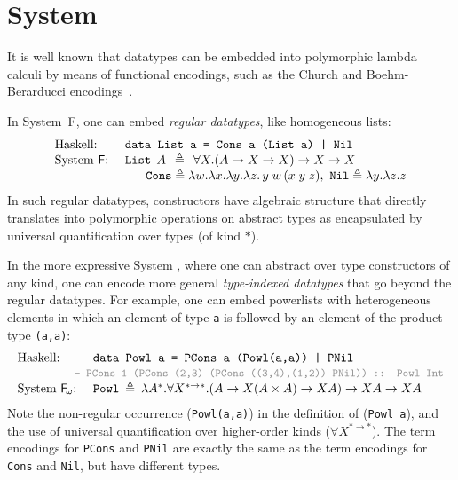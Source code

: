 \chapter{System \Fi}\label{ch:fi}

\newcommand{\newFi}[1]{\colorbox{grey}{\ensuremath{#1}}}

It is well known that datatypes can be embedded into polymorphic lambda
calculi by means of functional encodings,
such as the Church and Boehm-Berarducci encodings~\cite{BoehmBerarducci}.

In System~\textsf{F}, one can embed \emph{regular datatypes},
like homogeneous lists:
\[
\begin{array}{ll}
\text{Haskell:} & \texttt{data List a = Cons a (List a) | Nil} \\
\text{System \textsf{F}:}~& 
\texttt{{List}}\:\: A\:\:\triangleq\:\:
\forall X.
(A\to X\to X) \to X \to X ~~\; \\
&
\quad~~
\texttt{Cons} \triangleq \lambda w.\lambda x.\lambda y.\lambda z.\,y\;w\,(x\;y\;z),~
\texttt{Nil} \triangleq \lambda y.\lambda z.z
\end{array}
\]
In such regular datatypes, constructors have algebraic structure that
directly translates into polymorphic operations on abstract types as
encapsulated by universal quantification over types (of kind $*$).

In the more expressive System \Fw, where one can abstract over
type constructors of any kind, one can encode more general
\emph{type-indexed datatypes} that go beyond the regular datatypes.
For example, one can embed powerlists with heterogeneous elements
in which an element of type \texttt{a} is followed by
an element of the product type \texttt{(a,a)}:
\[
\begin{array}{ll}
\text{Haskell:} & \texttt{data Powl a = 
        PCons a (Powl(a,a))
        | 
        PNil 
} \\
& \!\!\!\!\!\!\!\!\!
  \textcolor{gray}{\small\texttt{-- PCons 1 (PCons (2,3) (PCons ((3,4),(1,2)) PNil)) :: Powl Int}}\\
\text{System \Fw:}~& \texttt{{Powl}}\:\triangleq\:
\lambda A^{*}.\forall X^{*\to*}. (A\to X(A\times A)\to X A) \to X A \to XA
\end{array}
\]
Note the non-regular occurrence (\texttt{Powl(a,a)}) in the definition of
(\texttt{Powl a}), and the use of universal quantification over
higher-order kinds ($\forall X^{*\to*}$).
The term encodings for {\small\tt PCons} and {\small\tt PNil} are exactly
the same as the term encodings for {\small\tt Cons} and {\small\tt Nil},
but have different types.

